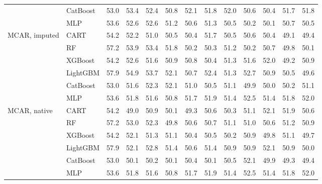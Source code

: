 \begin{table}[p]
\begin{tabular}{@{}llrrrrrrrrrrr@{}}
 & CatBoost & 53.0 & 53.4 & 52.4 & 50.8 & 52.1 & 51.8 & 52.0 & 50.6 & 50.4 & 51.7 & 51.8 \\
 & MLP & 53.6 & 52.6 & 52.6 & 51.2 & 50.6 & 51.3 & 50.5 & 50.2 & 50.1 & 50.7 & 50.5 \\
\midrule
MCAR, imputed & CART & 54.2 & 52.2 & 51.0 & 50.5 & 50.4 & 51.7 & 50.5 & 50.6 & 50.4 & 49.1 & 49.4 \\
 & RF & 57.2 & 53.9 & 53.4 & 51.8 & 50.2 & 50.3 & 51.2 & 50.2 & 50.7 & 49.8 & 50.1 \\
 & XGBoost & 54.2 & 52.6 & 51.6 & 50.9 & 50.8 & 50.4 & 51.3 & 51.6 & 52.0 & 49.2 & 50.9 \\
 & LightGBM & 57.9 & 54.9 & 53.7 & 52.1 & 50.7 & 52.4 & 51.3 & 52.7 & 50.9 & 50.5 & 49.6 \\
 & CatBoost & 53.0 & 51.6 & 52.3 & 52.1 & 51.0 & 50.5 & 51.1 & 49.9 & 50.0 & 50.2 & 51.1 \\
 & MLP & 53.6 & 51.8 & 51.6 & 50.8 & 51.7 & 51.9 & 51.4 & 52.5 & 51.4 & 51.8 & 52.0 \\
\midrule
MCAR, native & CART & 54.2 & 49.0 & 50.9 & 50.1 & 49.3 & 50.6 & 50.3 & 51.1 & 52.1 & 51.9 & 50.6 \\
 & RF & 57.2 & 53.0 & 52.3 & 49.8 & 50.6 & 50.7 & 51.1 & 51.0 & 50.6 & 51.2 & 50.9 \\
 & XGBoost & 54.2 & 52.1 & 51.3 & 51.1 & 50.4 & 50.5 & 50.2 & 50.9 & 49.8 & 51.1 & 49.7 \\
 & LightGBM & 57.9 & 52.1 & 52.8 & 51.4 & 50.6 & 51.4 & 50.9 & 50.9 & 52.1 & 50.9 & 50.0 \\
 & CatBoost & 53.0 & 50.1 & 50.2 & 50.1 & 50.4 & 50.1 & 50.5 & 52.1 & 49.9 & 49.3 & 49.4 \\
 & MLP & 53.6 & 51.8 & 51.6 & 50.8 & 51.7 & 51.9 & 51.4 & 52.5 & 51.4 & 51.8 & 52.0 \\
\bottomrule
\end{tabular}
\end{table}

